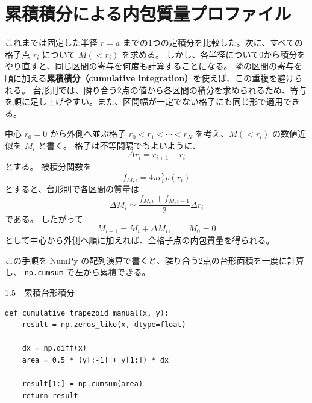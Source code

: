 \section{累積積分による内包質量プロファイル}
\label{sec:ch1-cumulative}

これまでは固定した半径 $r=a$ までの1つの定積分を比較した。次に、すべての格子点 $r_i$ について $M(<r_i)$ を求める。
しかし、各半径について0から積分をやり直すと、同じ区間の寄与を何度も計算することになる。
隣の区間の寄与を順に加える\textbf{累積積分（cumulative integration）}を使えば、この重複を避けられる。
台形則では、隣り合う2点の値から各区間の積分を求められるため、寄与を順に足し上げやすい。また、区間幅が一定でない格子にも同じ形で適用できる。

中心 $r_0=0$ から外側へ並ぶ格子 $r_0<r_1<\cdots<r_N$ を考え、$M(<r_i)$ の数値近似を $M_i$ と書く。
格子は不等間隔でもよいように、
\begin{equation}
 \Delta r_i=r_{i+1}-r_i
\label{eq:ch1-nonuniform-dr}
\end{equation}
とする。
被積分関数を
\begin{equation}
 f_{M,i}=4\pi r_i^2\rho(r_i)
\label{eq:ch1-gi}
\end{equation}
とすると、台形則で各区間の質量は
\begin{equation}
 \Delta M_i
 \simeq
 \frac{f_{M,i}+f_{M,i+1}}{2}\Delta r_i
\label{eq:ch1-delta-mi}
\end{equation}
である。
したがって
\begin{equation}
 M_{i+1}=M_i+\Delta M_i,
 \qquad M_0=0
\label{eq:ch1-cumulative-recurrence}
\end{equation}
として中心から外側へ順に加えれば、全格子点の内包質量を得られる。

この手順を NumPy の配列演算で書くと、隣り合う2点の台形面積を一度に計算し、
\texttt{np.cumsum} で左から累積できる。

\begin{listingbox}{1.5　累積台形積分}
\begin{Verbatim}[fontsize=\small]
def cumulative_trapezoid_manual(x, y):
    result = np.zeros_like(x, dtype=float)

    dx = np.diff(x)
    area = 0.5 * (y[:-1] + y[1:]) * dx

    result[1:] = np.cumsum(area)
    return result
\end{Verbatim}
\end{listingbox}

